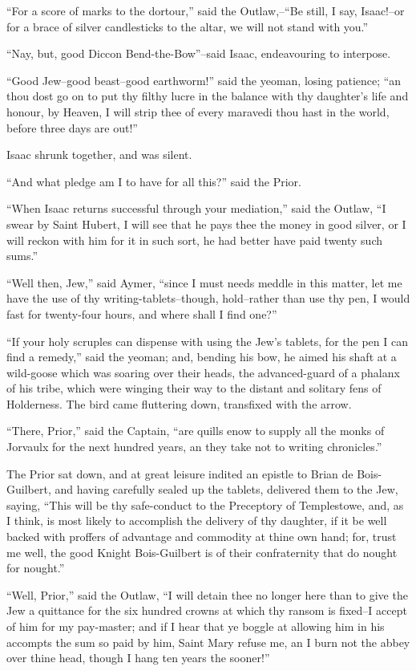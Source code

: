``For a score of marks to the dortour,'' said the Outlaw,--``Be still, I
say, Isaac!--or for a brace of silver candlesticks to the altar, we will
not stand with you.''

``Nay, but, good Diccon Bend-the-Bow''--said Isaac, endeavouring to
interpose.

``Good Jew--good beast--good earthworm!'' said the yeoman, losing
patience; ``an thou dost go on to put thy filthy lucre in the balance
with thy daughter's life and honour, by Heaven, I will strip thee of
every maravedi thou hast in the world, before three days are out!''

Isaac shrunk together, and was silent.

``And what pledge am I to have for all this?'' said the Prior.

``When Isaac returns successful through your mediation,'' said the
Outlaw, ``I swear by Saint Hubert, I will see that he pays thee the
money in good silver, or I will reckon with him for it in such sort, he
had better have paid twenty such sums.''

``Well then, Jew,'' said Aymer, ``since I must needs meddle in this
matter, let me have the use of thy writing-tablets--though, hold--rather
than use thy pen, I would fast for twenty-four hours, and where shall I
find one?''

``If your holy scruples can dispense with using the Jew's tablets, for
the pen I can find a remedy,'' said the yeoman; and, bending his bow, he
aimed his shaft at a wild-goose which was soaring over their heads, the
advanced-guard of a phalanx of his tribe, which were winging their way
to the distant and solitary fens of Holderness. The bird came fluttering
down, transfixed with the arrow.

``There, Prior,'' said the Captain, ``are quills enow to supply all the
monks of Jorvaulx for the next hundred years, an they take not to
writing chronicles.''

The Prior sat down, and at great leisure indited an epistle to Brian de
Bois-Guilbert, and having carefully sealed up the tablets, delivered
them to the Jew, saying, ``This will be thy safe-conduct to the
Preceptory of Templestowe, and, as I think, is most likely to accomplish
the delivery of thy daughter, if it be well backed with proffers of
advantage and commodity at thine own hand; for, trust me well, the good
Knight Bois-Guilbert is of their confraternity that do nought for
nought.''

``Well, Prior,'' said the Outlaw, ``I will detain thee no longer here
than to give the Jew a quittance for the six hundred crowns at which thy
ransom is fixed--I accept of him for my pay-master; and if I hear that
ye boggle at allowing him in his accompts the sum so paid by him, Saint
Mary refuse me, an I burn not the abbey over thine head, though I hang
ten years the sooner!''

